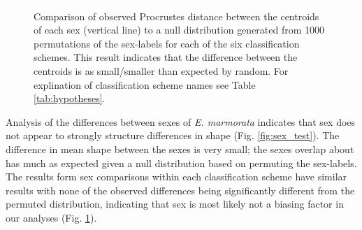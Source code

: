 \documentclass[10pt,letterpaper]{article}
\begin{document}
\afterpage{\clearpage}
\begin{figure}[h]
  \centering
  \includegraphics[height = 0.8\textheight, width = \textwidth, keepaspectratio = true]{figure/sex_test_hist_grouped}
  \caption{Comparison of observed Procrustes distance between the centroids of each sex (vertical line) to a null distribution generated from 1000 permutations of the sex-labels for each of the six classification schemes. This result indicates that the difference between the centroids is as small/smaller than expected by random. For explination of classification scheme names see Table \ref{tab:hypotheses}.}
  \label{fig:sex_test_group}
\end{figure}

Analysis of the differences between sexes of \textit{E. marmorata} indicates that sex does not appear to strongly structure differences in shape (Fig. \ref{fig:sex_test}). The difference in mean shape between the sexes is very small; the sexes overlap about has much as expected given a null distribution based on permuting the sex-labels. The results form sex comparisons within each classification scheme have similar results with none of the observed differences being significantly different from the permuted distribution, indicating that sex is most likely not a biasing factor in our analyses (Fig. \ref{fig:sex_test_group}).
\end{document}
